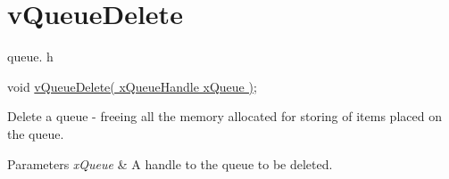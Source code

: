 \hypertarget{group__vQueueDelete}{}\section{v\+Queue\+Delete}
\label{group__vQueueDelete}
queue. h 
\begin{DoxyPre}void \hyperlink{queue_8h_a9baffc75681546db871af6aecb346f41}{vQueueDelete( xQueueHandle xQueue )};\end{DoxyPre}


Delete a queue -\/ freeing all the memory allocated for storing of items placed on the queue.


\begin{DoxyParams}{Parameters}
{\em x\+Queue} & A handle to the queue to be deleted. \\
\hline
\end{DoxyParams}
